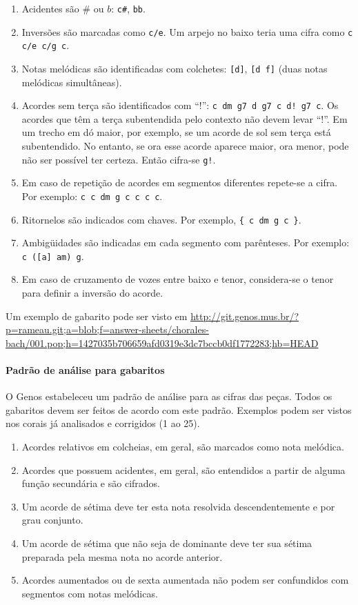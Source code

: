 \documentclass[12pt,brazil]{book}
\begin{document}
\begin{enumerate}
\begin{enumerate}
\begin{enumerate}
    \end{enumerate}
  \end{enumerate}
  \item Acidentes são $\#$ ou $b$: \texttt{c\#}, \texttt{bb}.
  \item Inversões são marcadas como \texttt{c/e}. Um arpejo no baixo
    teria uma cifra como \texttt{c c/e c/g c}.
\item Notas melódicas são identificadas com colchetes: \texttt{[d]},
  \texttt{[d f]} (duas notas melódicas simultâneas).
\item Acordes sem terça são identificados com ``!'': \texttt{c dm g7
    d g7 c d!  g7 c}. Os acordes que têm a terça subentendida pelo
  contexto não devem levar ``!''. Em um trecho em dó maior, por
  exemplo, se um acorde de sol sem terça está subentendido. No
  entanto, se ora esse acorde aparece maior, ora menor, pode não ser
  possível ter certeza. Então cifra-se \texttt{g!}.
\item Em caso de repetição de acordes em segmentos diferentes
  repete-se a cifra. Por exemplo: \texttt{c c dm g c c c c}.
\item Ritornelos são indicados com chaves. Por exemplo, \texttt{\{ c
    dm g c \}}.
\item Ambigüidades são indicadas em cada segmento com parênteses. Por
  exemplo: \texttt{c ([a] am) g}.
\item Em caso de cruzamento de vozes entre baixo e tenor, considera-se
  o tenor para definir a inversão do acorde.
\end{enumerate}

Um exemplo de gabarito pode ser visto em
\url{http://git.genos.mus.br/?p=rameau.git;a=blob;f=answer-sheets/chorales-bach/001.pop;h=1427035b706659afd0319e3dc7bccb0df1772283;hb=HEAD}

\paragraph{Padrão de análise para gabaritos}
\label{sec:padrao-de-analise}

O Genos estabeleceu um padrão de análise para as cifras das
peças. Todos os gabaritos devem ser feitos de acordo com este
padrão. Exemplos podem ser vistos nos corais já analisados e
corrigidos (1 ao 25).

\begin{enumerate}
\item Acordes relativos em colcheias, em geral, são marcados como nota
  melódica.
\item Acordes que possuem acidentes, em geral, são entendidos a partir
  de alguma função secundária e são cifrados.
\item Um acorde de sétima deve ter esta nota resolvida
  descendentemente e por grau conjunto.
\item Um acorde de sétima que não seja de dominante deve ter sua
  sétima preparada pela mesma nota no acorde anterior.
\item Acordes aumentados ou de sexta aumentada não podem ser
  confundidos com segmentos com notas melódicas.
\end{enumerate}
\end{document}
